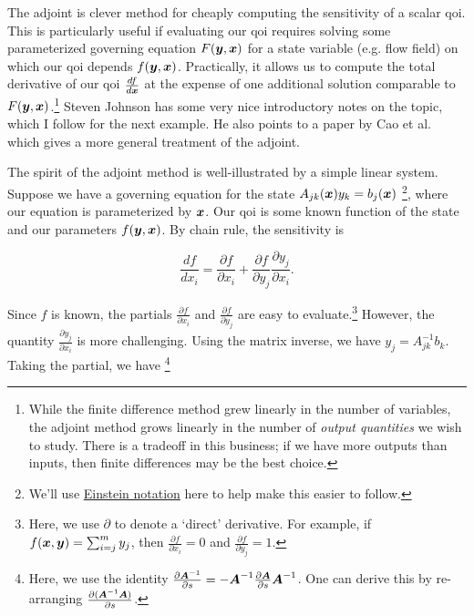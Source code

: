 \documentclass[../primer.tex]{subfiles}
\begin{document}
The adjoint is clever method for cheaply computing the sensitivity of a scalar
qoi. This is particularly useful if evaluating our qoi requires solving some
parameterized governing equation $F(\boldsymbol{y},\boldsymbol{x})$ for a state variable (e.g. flow
field) on which our qoi depends $f(\boldsymbol{y},\boldsymbol{x})$. Practically, it allows us to
compute the total derivative of our qoi $\frac{df}{d\boldsymbol{x}}$ at the expense of one
additional solution comparable to $F(\boldsymbol{y},\boldsymbol{x})$.\footnote{While the finite
  difference method grew linearly in the number of variables, the adjoint method
  grows linearly in the number of \emph{output quantities} we wish to study.
  There is a tradeoff in this business; if we have more outputs than inputs,
  then finite differences may be the best choice.} Steven Johnson
\cite{johnson2012} has some very nice introductory notes on the topic, which I
follow for the next example. He also points to a paper by Cao et
al.\cite{cao2003adjoint} which gives a more general treatment of the adjoint.

The spirit of the adjoint method is well-illustrated by a simple linear system.
Suppose we have a governing equation for the state
$A_{jk}(\boldsymbol{x})y_k=b_j(\boldsymbol{x})$ \footnote{We'll use
  \href{https://en.wikipedia.org/wiki/Einstein_notation}{Einstein notation} here
  to help make this easier to follow.}, where our equation is parameterized by
$\boldsymbol{x}$. Our qoi is some known function of the state and our parameters
$f(\boldsymbol{y},\boldsymbol{x})$. By chain rule, the sensitivity is

\begin{equation}\label{eq:linear-sens}
  \frac{df}{dx_i} = \frac{\partial f}{\partial x_i} %
                  + \frac{\partial f}{\partial y_j}\frac{\partial y_j}{\partial x_i}.
\end{equation}

\noindent Since $f$ is known, the partials $\frac{\partial f}{\partial x_i}$ and
$\frac{\partial f}{\partial y_j}$ are easy to evaluate.\footnote{Here, we use
  $\partial$ to denote a `direct' derivative. For example, if
  $f(\boldsymbol{x},\boldsymbol{y})=\sum_{i=j}^my_j$, then $\frac{\partial f}{\partial x_i}=0$ and
  $\frac{\partial f}{\partial y_j}=1$.} However, the quantity $\frac{\partial
  y_j}{\partial x_i}$ is more challenging. Using the matrix inverse, we have
$y_j=A_{jk}^{-1}b_k$. Taking the partial, we have \footnote{Here, we use the
  identity $\frac{\partial \boldsymbol{A}^{-1}}{\partial s} =-\nobreak
  \boldsymbol{A}^{-1}\frac{\partial \boldsymbol{A}}{\partial s}\boldsymbol{A}^{-1}$. One can derive this by
  re-arranging $\frac{\partial(\boldsymbol{A}^{-1}\boldsymbol{A})}{\partial s}$.}
\end{document}
